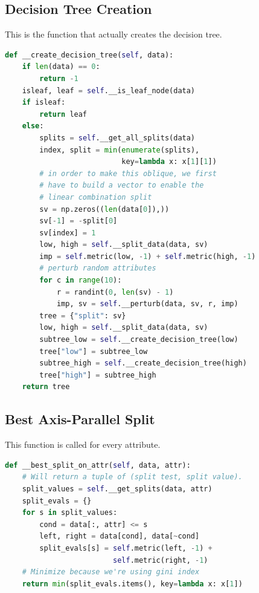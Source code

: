 \documentclass[12pt]{article}
\begin{document}
\subsection{Decision Tree Creation}
This is the function that actually creates the decision tree.
\begin{lstlisting}[language=Python]
def __create_decision_tree(self, data):
    if len(data) == 0:
        return -1
    isleaf, leaf = self.__is_leaf_node(data)
    if isleaf:
        return leaf
    else:
        splits = self.__get_all_splits(data)
        index, split = min(enumerate(splits), 
                           key=lambda x: x[1][1])
        # in order to make this oblique, we first 
        # have to build a vector to enable the
        # linear combination split
        sv = np.zeros((len(data[0]),))
        sv[-1] = -split[0]
        sv[index] = 1
        low, high = self.__split_data(data, sv)
        imp = self.metric(low, -1) + self.metric(high, -1)
        # perturb random attributes
        for c in range(10):
            r = randint(0, len(sv) - 1)
            imp, sv = self.__perturb(data, sv, r, imp)
        tree = {"split": sv}
        low, high = self.__split_data(data, sv)
        subtree_low = self.__create_decision_tree(low)
        tree["low"] = subtree_low
        subtree_high = self.__create_decision_tree(high)
        tree["high"] = subtree_high
    return tree
\end{lstlisting}

\subsection{Best Axis-Parallel Split}
This function is called for every attribute.
\begin{lstlisting}[language=Python]
def __best_split_on_attr(self, data, attr):
    # Will return a tuple of (split test, split value).
    split_values = self.__get_splits(data, attr)
    split_evals = {}
    for s in split_values:
        cond = data[:, attr] <= s
        left, right = data[cond], data[~cond]
        split_evals[s] = self.metric(left, -1) + 
                         self.metric(right, -1)
    # Minimize because we're using gini index
    return min(split_evals.items(), key=lambda x: x[1])
\end{lstlisting}
\end{document}
